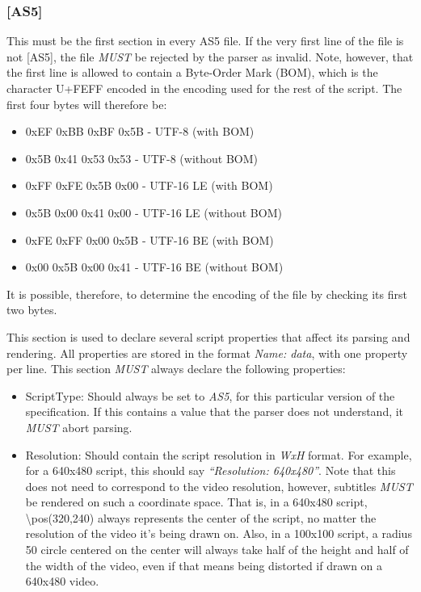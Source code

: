 \documentclass{spec}
\begin{document}
\subsubsection{[AS5]}
This must be the first section in every AS5 file. If the very first line of the file is not
[AS5], the file \emph{MUST} be rejected by the parser as invalid. Note, however, that the first
line is allowed to contain a Byte-Order Mark (BOM), which is the character U+FEFF encoded in
the encoding used for the rest of the script\cite{Unicode BOM}. The first four bytes will therefore be:

\begin{itemize}
\item 0xEF 0xBB 0xBF 0x5B - UTF-8 (with BOM)
\item 0x5B 0x41 0x53 0x53 - UTF-8 (without BOM)
\item 0xFF 0xFE 0x5B 0x00 - UTF-16 LE (with BOM)
\item 0x5B 0x00 0x41 0x00 - UTF-16 LE (without BOM)
\item 0xFE 0xFF 0x00 0x5B - UTF-16 BE (with BOM)
\item 0x00 0x5B 0x00 0x41 - UTF-16 BE (without BOM)
\end{itemize}

It is possible, therefore, to determine the encoding of the file by checking its first two bytes.

This section is used to declare several script properties that affect its parsing and rendering.
All properties are stored in the format \textit{Name: data}, with one property per line. 
This section \emph{MUST} always declare the following properties:

\begin{itemize}
\item ScriptType: Should always be set to \textit{AS5}, for this particular version of the specification.
If this contains a value that the parser does not understand, it \emph{MUST} abort parsing.
\item Resolution: Should contain the script resolution in \textit{WxH} format. For example, for a 640x480
script, this should say \textit{"`Resolution: 640x480"'}. Note that this does not need to correspond to the
video resolution, however, subtitles \emph{MUST} be rendered on such a coordinate space. That is, in a
640x480 script, \textbackslash{pos(320,240)} always represents the center of the script, no matter the
resolution of the video it's being drawn on. Also, in a 100x100 script, a radius 50 circle centered on
the center will always take half of the height and half of the width of the video, even if that means
being distorted if drawn on a 640x480 video.
\end{itemize}
\end{document}
